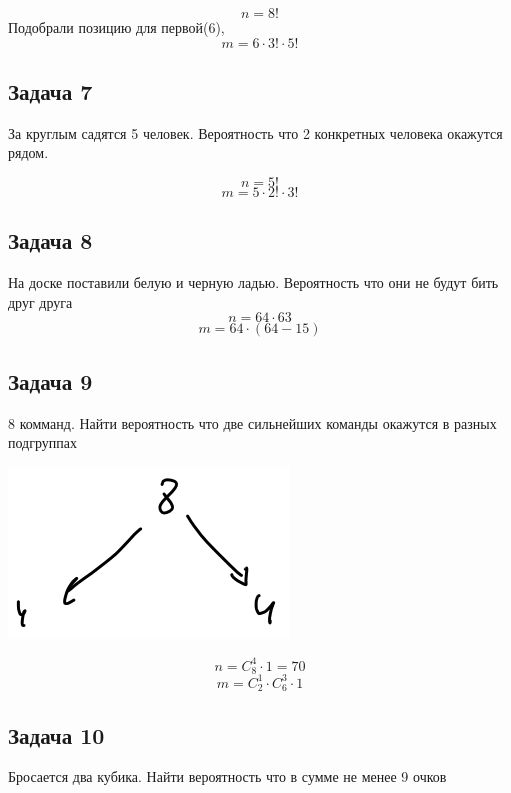 \documentclass[english]{article}
\theoremstyle{plain}
\theoremstyle{remark}
\theoremstyle{definition}
\begin{document}
\[ n = 8! \]
Подобрали позицию для первой(6), 
\[ m = 6 \cdot 3!\cdot 5! \]

\subsection{Задача 7}
\label{sec:orged2e592}
За круглым садятся 5 человек. Вероятность что 2 конкретных человека окажутся рядом.

\[ n = 5! \]
\[ m = 5\cdot 2! \cdot 3! \]

\subsection{Задача 8}
\label{sec:orgdbdbba5}
На доске поставили белую и черную ладью. Вероятность что они не будут бить друг друга
\[ n = 64 \cdot 63 \]
\[ m = 64\cdot(64 - 15) \]

\subsection{Задача 9}
\label{sec:org58be12b}
8 комманд. Найти вероятность что две сильнейших команды окажутся в разных подгруппах

\begin{center}
\includegraphics[scale=0.5]{1_8.png}
\end{center}

\[ n = C^4_8\cdot 1 = 70 \]
\[ m = C^1_2\cdot C^3_6 \cdot 1 \]

\subsection{Задача 10}
\label{sec:org257165a}
Бросается два кубика. Найти вероятность что в сумме не менее 9 очков
\end{document}

